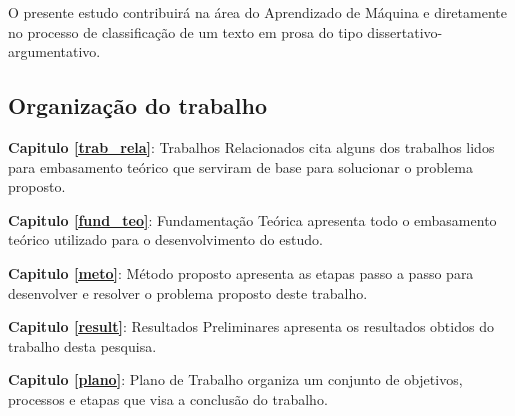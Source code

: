 O presente estudo contribuirá na área do Aprendizado de Máquina e diretamente no processo de classificação de um texto em prosa do tipo dissertativo-argumentativo.

\subsection{Organização do trabalho}

\noindent \textbf{Capitulo \ref{trab_rela}}: Trabalhos Relacionados cita alguns dos trabalhos lidos para  embasamento teórico que serviram de base para solucionar o problema proposto.

\noindent \textbf{Capitulo \ref{fund_teo}}: Fundamentação Teórica apresenta todo o embasamento teórico utilizado para o desenvolvimento do estudo.

\noindent \textbf{Capitulo \ref{meto}}: Método proposto apresenta as etapas passo a passo para desenvolver e resolver o problema proposto deste trabalho.

\noindent \textbf{Capitulo \ref{result}}: Resultados Preliminares apresenta os resultados obtidos do trabalho desta pesquisa.

\noindent \textbf{Capitulo \ref{plano}}: Plano de Trabalho organiza um conjunto de objetivos, processos e etapas que visa a conclusão do trabalho.

